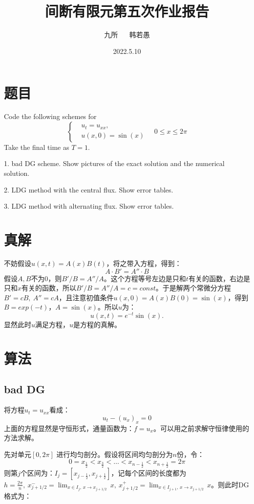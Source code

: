 \documentclass[12pt, a4paper]{ctexart}
\title{间断有限元第五次作业报告}
\author{九所 $\quad$ 韩若愚}
\date{2022.5.10}
\begin{document}
	\maketitle
	
	\tableofcontents
	
	\section{题目}
	Code the following schemes for 
	\begin{equation*}
	\begin{cases}
	& u_t = u_{xx},\\
	& u(x,0) = \sin(x)
	\end{cases}
	\quad 0 \leq x \leq 2\pi
	\end{equation*}
	Take the final time as $T = 1$.
	
	1. bad DG scheme. Show pictures of the exact solution and the numerical solution.
	
	2. LDG method with the central flux. Show error tables.
	
	3. LDG method with alternating flux. Show error tables.
	
	\section{真解}
	
	不妨假设$u (x,t) = A(x)B(t)$，将之带入方程，得到：
	$$
	A \cdot B' = A'' \cdot B
	$$
	假设$A,B$不为0，则$B'/B = A''/A$。这个方程等号左边是只和$t$有关的函数，右边是只和$x$有关的函数，所以$B'/B = A''/A = c = const$。于是解两个常微分方程$B' = cB,\  A'' = cA$，且注意初值条件$ u(x,0) = A(x)B(0) = \sin(x)$，得到$B = exp(-t)$，$A = \sin(x)$。所以$u$为：
	$$
	u (x,t) = e^{-t} \sin(x).
	$$
	显然此时$u$满足方程，$u$是方程的真解。
	
	\section{算法}
	
	\subsection{bad DG}
	
	将方程$u_t = u_{xx}$看成：
	$$
	u_t - (u_x)_x = 0
	$$
	上面的方程显然是守恒形式，通量函数为：$f = u_x$。可以用之前求解守恒律使用的方法求解。
	
	先对单元$[0,2\pi]$ 进行均匀剖分。假设将区间均匀剖分为$n$份，令：
	\begin{equation*}
	0 = x_{\frac{1}{2}} < x_{\frac{3}{2}} < \dots < x_{n-\frac{1}{2}} < x_{n+\frac{1}{2}} = 2\pi
	\end{equation*}
	则第$j$个区间为：$ I_j = [x_{j- \frac{1}{2}}, x_{j + \frac{1}{2}}]$，记每个区间的长度都为$h = \frac{2\pi}{n},\  x_{j+1/2}^- = \lim_{x \in I_j, \, x \to x_{j+1/2}} \, x, \  x_{j+1/2}^+ = \lim_{x \in I_{j+1}, \, x \to x_{j+1/2}} \, x$。则此时DG格式为：
	
\end{document}
